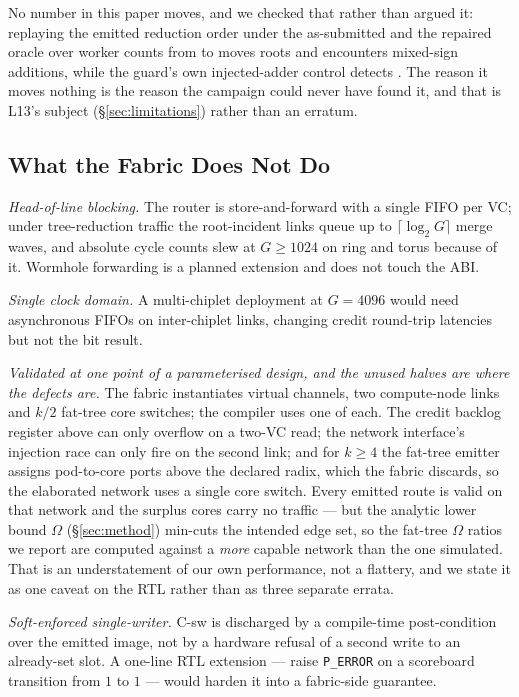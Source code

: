 \documentclass[journal,10pt]{IEEEtran}
\theoremstyle{plain}
\theoremstyle{definition}
\theoremstyle{remark}
\begin{document}
No number in this paper moves, and we checked that rather than argued it:
replaying the emitted reduction order under the as-submitted and the repaired
oracle over \FpScopeGvals{} worker counts from \FpScopeGLo{} to \FpScopeGHi{}
moves \FpScopeMoved{} roots and encounters \FpScopeMixed{} mixed-sign
additions, while the guard's own injected-adder control detects
\FpScopeMutant{}. The reason it moves nothing is the reason the campaign
could never have found it, and that is L13's subject
(\S\ref{sec:limitations}) rather than an erratum.

\subsection{What the Fabric Does Not Do}\label{sec:fabric-lim}

\emph{Head-of-line blocking.} The router is store-and-forward with a single
FIFO per VC; under tree-reduction traffic the root-incident links queue up to
$\lceil \log_2 G\rceil$ merge waves, and absolute cycle counts slew at $G \geq
1024$ on ring and torus because of it. Wormhole forwarding is a planned
extension and does not touch the ABI.

\emph{Single clock domain.} A multi-chiplet deployment at $G = 4096$ would
need asynchronous FIFOs on inter-chiplet links, changing credit round-trip
latencies but not the bit result.

\emph{Validated at one point of a parameterised design, and the unused halves
are where the defects are.} The fabric instantiates \NumVcs{} virtual
channels, two compute-node links and $k/2$ fat-tree core switches; the
compiler uses one of each. The credit backlog register above can only
overflow on a two-VC read; the network interface's injection race can only
fire on the second link; and for $k \geq 4$ the fat-tree emitter assigns
pod-to-core ports above the declared radix, which the fabric discards, so the
elaborated network uses a single core switch. Every emitted route is valid on
that network and the surplus cores carry no traffic --- but the analytic lower
bound $\Omega$ (\S\ref{sec:method}) min-cuts the intended edge set, so the
fat-tree $\Omega$ ratios we report are computed against a \emph{more} capable
network than the one simulated. That is an understatement of our own
performance, not a flattery, and we state it as one caveat on the RTL rather
than as three separate errata.

\emph{Soft-enforced single-writer.} \textsf{C-sw} is discharged by a
compile-time post-condition over the emitted image, not by a hardware refusal
of a second write to an already-set slot. A one-line RTL extension --- raise
\texttt{P\_ERROR} on a scoreboard transition from $1$ to $1$ --- would harden
it into a fabric-side guarantee.
\end{document}
